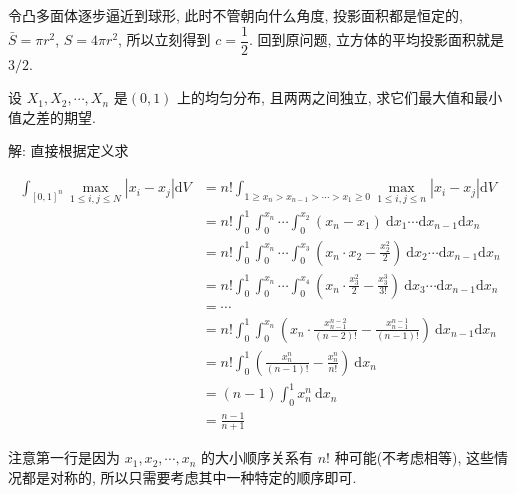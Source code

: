 令凸多面体逐步逼近到球形, 此时不管朝向什么角度, 投影面积都是恒定的, $\bar{S} = \pi r^2$, $S=4\pi r^2$, 所以立刻得到 $c=\dfrac{1}{2}$. 回到原问题, 立方体的平均投影面积就是 $3/2$.


\newpage

设 $X_1, X_2, \cdots, X_n$ 是$(0,1)$ 上的均匀分布, 且两两之间独立, 求它们最大值和最小值之差的期望.

解: 直接根据定义求

\begin{align*}
\int_{[0,1]^n} {\max_{1\le i,j\le N}|x_i-x_j| \mathrm{d}V} &= n!\int_{1\ge x_n > x_{n-1}>\cdots >x_1\ge 0} {\max_{1\le i,j\le n}|x_i-x_j|} \mathrm{d}V\\
&= n!\int_0^1 \int_0^{x_n} \cdots \int_0^{x_2}{(x_n-x_1)}\ \mathrm{d}x_1\cdots\mathrm{d}x_{n-1}\mathrm{d}x_n\\
&= n!\int_0^1 \int_0^{x_n} \cdots \int_0^{x_3}{\left(x_n\cdot x_2-\frac{x_2^2}{2}\right)}\ \mathrm{d}x_2\cdots\mathrm{d}x_{n-1}\mathrm{d}x_n\\
&= n!\int_0^1 \int_0^{x_n} \cdots \int_0^{x_4}{\left(x_n\cdot\frac{x_3^2}{2}-\frac{x_3^3}{3!}\right)}\ \mathrm{d}x_3\cdots\mathrm{d}x_{n-1}\mathrm{d}x_n\\
&=\cdots\\
&=n!\int_0^1 \int_0^{x_n} {\left(x_n\cdot\frac{x_{n-1}^{n-2}}{(n-2)!}-\frac{x_{n-1}^{n-1}}{(n-1)!}\right)}\  \mathrm{d}x_{n-1}\mathrm{d}x_n\\
&=n!\int_0^1{\left(\frac{x_n^n}{(n-1)!} - \frac{x_n^n}{n!}\right)}\ \mathrm{d}x_n\\
&=(n-1)\int_0^1{x_n^n}\ \mathrm{d}x_n\\
&=\frac{n-1}{n+1}
\end{align*}

注意第一行是因为 $x_1,x_2,\cdots,x_n$ 的大小顺序关系有 $n!$ 种可能(不考虑相等), 这些情况都是对称的, 所以只需要考虑其中一种特定的顺序即可.
















